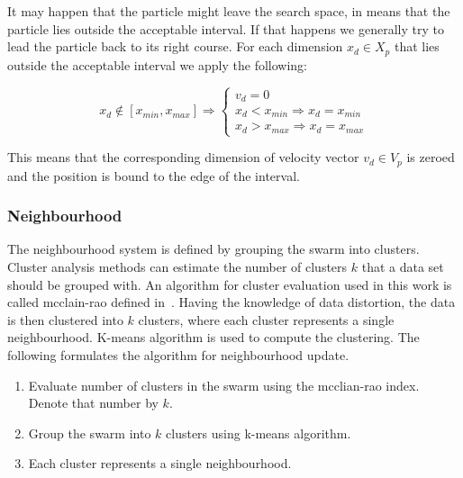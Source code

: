 \documentclass{article}
\begin{document}
It may happen that the particle might leave the search space, in means that the particle lies outside the acceptable interval. If that happens we generally try to lead the particle back to its right course. For each dimension $x_{d} \in X_p$ that lies  outside the acceptable interval we apply the following:

  \[
	x_{d} \notin [x_{min}, x_{max}] \Rightarrow \left \{
                \begin{array}{ll}
                  v_{d} = 0 \\
                  x_d < x_{min} \Rightarrow x_d = x_{min} \\
                  x_d > x_{max} \Rightarrow x_d = x_{max}
                \end{array}
              \right.
  \]

This means that the corresponding dimension of velocity vector $v_d \in V_p$ is zeroed and the position is bound to the edge of the interval.

\subsubsection{Neighbourhood}
The neighbourhood system is defined by grouping the swarm into clusters. Cluster analysis methods can estimate the number of clusters $k$ that a data set should be grouped with. An algorithm for cluster evaluation used in this work is called mcclain-rao defined in~\cite{mc_rao}. Having the knowledge of data distortion, the data is then clustered into $k$ clusters, where each cluster represents a single neighbourhood. K-means algorithm is used to compute the clustering. The following formulates the algorithm for neighbourhood update.

\begin{enumerate}
	\item Evaluate number of clusters in the swarm using the mcclian-rao index. Denote that number by $k$.
	\item Group the swarm into $k$ clusters using k-means algorithm.
	\item Each cluster represents a single neighbourhood.
\end{enumerate}


\end{document}
